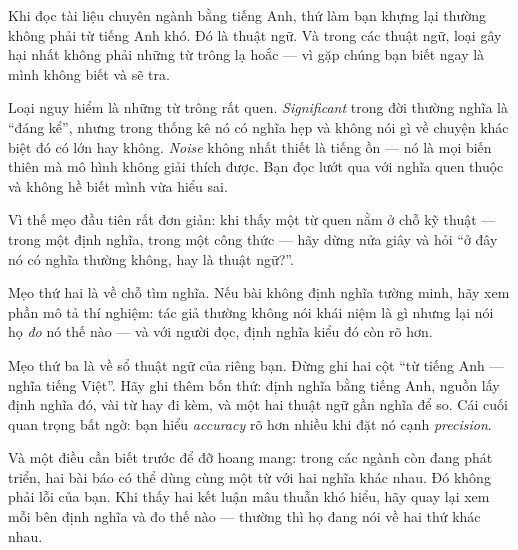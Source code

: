 \documentclass[../../english.tex]{subfiles}
\begin{document}
\begin{dongian}
Khi đọc tài liệu chuyên ngành bằng tiếng Anh, thứ làm bạn khựng lại thường không phải từ tiếng Anh khó. Đó là thuật ngữ. Và trong các thuật ngữ, loại gây hại nhất không phải những từ trông lạ hoắc --- vì gặp chúng bạn biết ngay là mình không biết và sẽ tra.

Loại nguy hiểm là những từ trông rất quen. \emph{Significant} trong đời thường nghĩa là ``đáng kể'', nhưng trong thống kê nó có nghĩa hẹp và không nói gì về chuyện khác biệt đó có lớn hay không. \emph{Noise} không nhất thiết là tiếng ồn --- nó là mọi biến thiên mà mô hình không giải thích được. Bạn đọc lướt qua với nghĩa quen thuộc và không hề biết mình vừa hiểu sai.

Vì thế mẹo đầu tiên rất đơn giản: khi thấy một từ quen nằm ở chỗ kỹ thuật --- trong một định nghĩa, trong một công thức --- hãy dừng nửa giây và hỏi ``ở đây nó có nghĩa thường không, hay là thuật ngữ?''.

Mẹo thứ hai là về chỗ tìm nghĩa. Nếu bài không định nghĩa tường minh, hãy xem phần mô tả thí nghiệm: tác giả thường không nói khái niệm là gì nhưng lại nói họ \emph{đo} nó thế nào --- và với người đọc, định nghĩa kiểu đó còn rõ hơn.

Mẹo thứ ba là về sổ thuật ngữ của riêng bạn. Đừng ghi hai cột ``từ tiếng Anh --- nghĩa tiếng Việt''. Hãy ghi thêm bốn thứ: định nghĩa bằng tiếng Anh, nguồn lấy định nghĩa đó, vài từ hay đi kèm, và một hai thuật ngữ gần nghĩa để so. Cái cuối quan trọng bất ngờ: bạn hiểu \emph{accuracy} rõ hơn nhiều khi đặt nó cạnh \emph{precision}.

Và một điều cần biết trước để đỡ hoang mang: trong các ngành còn đang phát triển, hai bài báo có thể dùng cùng một từ với hai nghĩa khác nhau. Đó không phải lỗi của bạn. Khi thấy hai kết luận mâu thuẫn khó hiểu, hãy quay lại xem mỗi bên định nghĩa và đo thế nào --- thường thì họ đang nói về hai thứ khác nhau.
\end{dongian}
\end{document}
